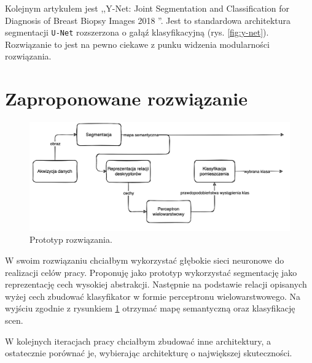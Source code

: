 Kolejnym artykułem jest ,,Y-Net: Joint Segmentation and Classification for Diagnosis of Breast Biopsy Images 2018 \cite{mehta2018net}''. Jest to standardowa architektura segmentacji \texttt{U-Net} rozszerzona o gałąź klasyfikacyjną (rys. \ref{fig:y-net}). Rozwiązanie to jest na pewno ciekawe z punku widzenia modularności rozwiązania.

\section{Zaproponowane rozwiązanie}
\begin{figure}[h]
    \includegraphics[width=\textwidth]{images/own-solution.png}
    \caption{Prototyp rozwiązania.}
    \label{fig:prototype}
\end{figure}
W swoim rozwiązaniu chciałbym wykorzystać głębokie sieci neuronowe do realizacji celów pracy. Proponuję jako prototyp wykorzystać segmentację jako reprezentację cech wysokiej abstrakcji. Następnie na podstawie relacji opisanych wyżej cech zbudować klasyfikator w formie perceptronu wielowarstwowego. Na wyjściu zgodnie z rysunkiem \ref{fig:prototype} otrzymać mapę semantyczną oraz klasyfikację scen.

W kolejnych iteracjach pracy chciałbym zbudować inne architektury, a ostatecznie porównać je, wybierając architekturę o największej skuteczności.